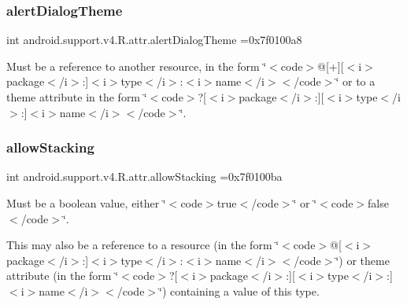 \subsubsection{\texorpdfstring{alert\+Dialog\+Theme}{alertDialogTheme}}
{\footnotesize\ttfamily int android.\+support.\+v4.\+R.\+attr.\+alert\+Dialog\+Theme =0x7f0100a8\hspace{0.3cm}{\ttfamily [static]}}

Must be a reference to another resource, in the form \char`\"{}$<$code$>$@\mbox{[}+\mbox{]}\mbox{[}$<$i$>$package$<$/i$>$\+:\mbox{]}$<$i$>$type$<$/i$>$\+:$<$i$>$name$<$/i$>$$<$/code$>$\char`\"{} or to a theme attribute in the form \char`\"{}$<$code$>$?\mbox{[}$<$i$>$package$<$/i$>$\+:\mbox{]}\mbox{[}$<$i$>$type$<$/i$>$\+:\mbox{]}$<$i$>$name$<$/i$>$$<$/code$>$\char`\"{}. \mbox{\label{classandroid_1_1support_1_1v4_1_1R_1_1attr_ab166be6b5606db68828a302f162f8cd0}} 
\subsubsection{\texorpdfstring{allow\+Stacking}{allowStacking}}
{\footnotesize\ttfamily int android.\+support.\+v4.\+R.\+attr.\+allow\+Stacking =0x7f0100ba\hspace{0.3cm}{\ttfamily [static]}}

Must be a boolean value, either \char`\"{}$<$code$>$true$<$/code$>$\char`\"{} or \char`\"{}$<$code$>$false$<$/code$>$\char`\"{}. 

This may also be a reference to a resource (in the form \char`\"{}$<$code$>$@\mbox{[}$<$i$>$package$<$/i$>$\+:\mbox{]}$<$i$>$type$<$/i$>$\+:$<$i$>$name$<$/i$>$$<$/code$>$\char`\"{}) or theme attribute (in the form \char`\"{}$<$code$>$?\mbox{[}$<$i$>$package$<$/i$>$\+:\mbox{]}\mbox{[}$<$i$>$type$<$/i$>$\+:\mbox{]}$<$i$>$name$<$/i$>$$<$/code$>$\char`\"{}) containing a value of this type. \mbox{\label{classandroid_1_1support_1_1v4_1_1R_1_1attr_a2e623c2b4980c56bac06c3ec52a679e5}} 
